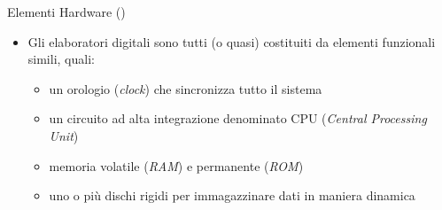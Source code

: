 %
%
%
%
%
\setcounter{ms}{1}
\begin{slide}{{Elementi Hardware ()}}
{
	\begin{itemize}
	\setlength{\itemsep}{10mm}

		\item Gli elaboratori digitali sono tutti (o quasi)
              costituiti da elementi funzionali simili, quali:

			  \begin{itemize}
			  \setlength{\itemsep}{8mm}

				\item un orologio (\emph{clock}) che sincronizza tutto
                      il sistema
				\item un circuito ad alta integrazione denominato CPU
				      (\emph{Central Processing Unit})
				\item memoria volatile (\emph{RAM})
				      e permanente (\emph{ROM})
				\item uno o pi\`u dischi rigidi per immagazzinare
				      dati in maniera dinamica

			\end{itemize}

	\end{itemize}

}
\end{slide}

